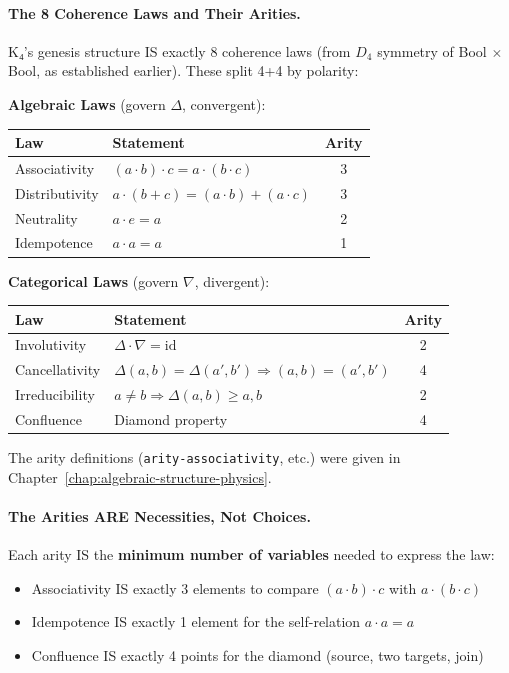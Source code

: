 \documentclass[11pt,a4paper]{book}
\begin{document}
\paragraph{The 8 Coherence Laws and Their Arities.}

K₄'s genesis structure IS exactly 8 coherence laws (from $D_4$ symmetry 
of Bool $\times$ Bool, as established earlier). These split 4+4 by polarity:

\textbf{Algebraic Laws} (govern $\Delta$, convergent):
\begin{center}
\begin{tabular}{llc}
Law & Statement & Arity \\
\hline
Associativity & $(a \cdot b) \cdot c = a \cdot (b \cdot c)$ & 3 \\
Distributivity & $a \cdot (b + c) = (a \cdot b) + (a \cdot c)$ & 3 \\
Neutrality & $a \cdot e = a$ & 2 \\
Idempotence & $a \cdot a = a$ & 1 \\
\end{tabular}
\end{center}

\textbf{Categorical Laws} (govern $\nabla$, divergent):
\begin{center}
\begin{tabular}{llc}
Law & Statement & Arity \\
\hline
Involutivity & $\Delta \cdot \nabla = \text{id}$ & 2 \\
Cancellativity & $\Delta(a,b) = \Delta(a',b') \Rightarrow (a,b) = (a',b')$ & 4 \\
Irreducibility & $a \neq b \Rightarrow \Delta(a,b) \geq a, b$ & 2 \\
Confluence & Diamond property & 4 \\
\end{tabular}
\end{center}

The arity definitions (\verb|arity-associativity|, etc.) were given in 
Chapter~\ref{chap:algebraic-structure-physics}.

\paragraph{The Arities ARE Necessities, Not Choices.}

Each arity IS the \textbf{minimum number of variables} needed to express the law:

\begin{itemize}
\item Associativity IS exactly 3 elements to compare $(a \cdot b) \cdot c$ with $a \cdot (b \cdot c)$
\item Idempotence IS exactly 1 element for the self-relation $a \cdot a = a$
\item Confluence IS exactly 4 points for the diamond (source, two targets, join)
\end{itemize}
\end{document}
